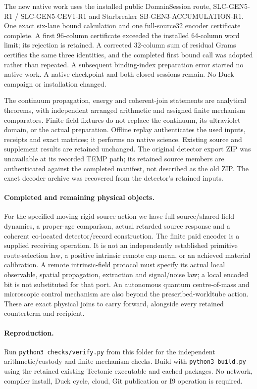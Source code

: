 The new native work uses the installed public DomainSession route,
SLC-GEN5-R1 / SLC-GEN5-CEV1-R1 and Starbreaker SB-GEN3-ACCUMULATION-R1.
One exact six-lane bound calculation and one full-source32 encoder
certificate complete. A first 96-column certificate exceeded the installed
64-column word limit; its rejection is retained. A corrected 32-column
sum of residual Grams certifies the same three identities, and the
completed first bound call was adopted rather than repeated. A subsequent
binding-index preparation error started no native work. A native checkpoint
and both closed sessions remain. No Duck campaign or installation changed.

The continuum propagation, energy and coherent-join statements are
analytical theorems, with independent arranged arithmetic and assigned
finite mechanism comparators. Finite field fixtures do not replace the
continuum, its ultraviolet domain, or the actual preparation. Offline
replay authenticates the used inputs, receipts and exact matrices; it
performs no native science. Existing source and supplement results are
retained unchanged. The original detector export ZIP was unavailable at
its recorded TEMP path; its retained source members are authenticated
against the completed manifest, not described as the old ZIP. The exact
decoder archive was recovered from the detector's retained inputs.

\paragraph{Completed and remaining physical objects.}
For the specified moving rigid-source action we have full source/shared-field
dynamics, a proper-age comparison, actual retarded source response and a
coherent co-located detector/record construction. The finite paid encoder
is a supplied receiving operation. It is not an independently established
primitive route-selection law, a positive intrinsic remote cap mean,
or an achieved material calibration. A remote intrinsic-field protocol
must specify its actual local observable, spatial propagation, extraction
and signal/noise law; a local encoded bit is not substituted for that port.
An autonomous quantum centre-of-mass and microscopic control mechanism
are also beyond the prescribed-worldtube action. These are exact physical
joins to carry forward, alongside every retained counterterm and recipient.

\paragraph{Reproduction.}
Run \texttt{python3 checks/verify.py} from this folder for the independent
arithmetic/custody and finite mechanism checks. Build with
\texttt{python3 build.py} using the retained existing Tectonic executable
and cached packages. No network, compiler install, Duck cycle, cloud,
Git publication or I9 operation is required.
\FloatBarrier
